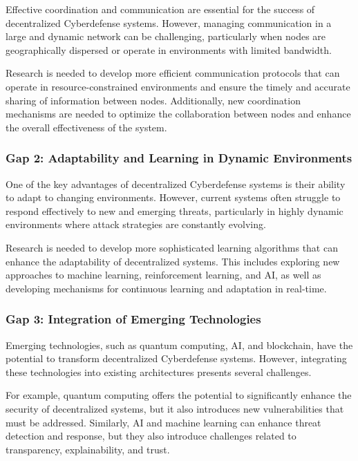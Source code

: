 Effective coordination and communication are essential for the success of decentralized Cyberdefense systems. However, managing communication in a large and dynamic network can be challenging, particularly when nodes are geographically dispersed or operate in environments with limited bandwidth.

Research is needed to develop more efficient communication protocols that can operate in resource-constrained environments and ensure the timely and accurate sharing of information between nodes. Additionally, new coordination mechanisms are needed to optimize the collaboration between nodes and enhance the overall effectiveness of the system.

\subsubsection{Gap 2: Adaptability and Learning in Dynamic Environments}

One of the key advantages of decentralized Cyberdefense systems is their ability to adapt to changing environments. However, current systems often struggle to respond effectively to new and emerging threats, particularly in highly dynamic environments where attack strategies are constantly evolving.

Research is needed to develop more sophisticated learning algorithms that can enhance the adaptability of decentralized systems. This includes exploring new approaches to machine learning, reinforcement learning, and AI, as well as developing mechanisms for continuous learning and adaptation in real-time.


\subsubsection{Gap 3: Integration of Emerging Technologies}

Emerging technologies, such as quantum computing, AI, and blockchain, have the potential to transform decentralized Cyberdefense systems. However, integrating these technologies into existing architectures presents several challenges.

For example, quantum computing offers the potential to significantly enhance the security of decentralized systems, but it also introduces new vulnerabilities that must be addressed. Similarly, AI and machine learning can enhance threat detection and response, but they also introduce challenges related to transparency, explainability, and trust.

